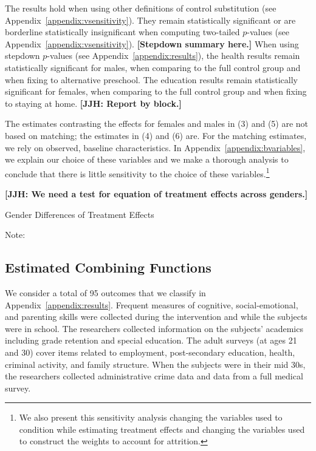 The results hold when using other definitions of control substitution (see Appendix~\ref{appendix:vsensitivity}). They remain statistically significant or are borderline statistically insignificant when computing two-tailed $p$-values (see Appendix~\ref{appendix:vsensitivity}). \textbf{[Stepdown summary here.]} When using stepdown $p$-values (see Appendix~\ref{appendix:results}), the health results remain statistically significant for males, when comparing to the full control group and when fixing to alternative preschool. The education results remain statistically significant for females, when comparing to the full control group and when fixing to staying at home. \textbf{[JJH: Report by block.]}

The estimates contrasting the effects for females and males in (3) and (5) are not based on matching; the estimates in (4) and (6) are. For the matching estimates, we rely on observed, baseline characteristics. In Appendix~\ref{appendix:bvariables}, we explain our choice of these variables and we make a thorough analysis to conclude that there is little sensitivity to the choice of these variables.\footnote{We also present this sensitivity analysis changing the variables used to condition while estimating treatment effects and changing the variables used to construct the weights to account for attrition.}

\textbf{[JJH: We need a test for equation of treatment effects across genders.]}

\begin{table}
\centering
\begin{threeparttable}
\caption{Gender Differences of Treatment Effects}\label{table:genderdifference-tes}
\begin{scriptsize}

\end{scriptsize}
\begin{tablenotes}
\scriptsize
Note: 
\end{tablenotes}
\end{threeparttable}
\end{table}

\subsection{Estimated Combining Functions}

We consider a total of 95 outcomes that we classify in Appendix~\ref{appendix:results}. Frequent measures of cognitive, social-emotional, and parenting skills were collected during the intervention and while the subjects were in school. The researchers collected information on the subjects' academics including grade retention and special education. The adult surveys (at ages 21 and 30) cover items related to employment, post-secondary education, health, criminal activity, and family structure. When the subjects were in their mid 30s, the researchers collected administrative crime data and data from a full medical survey.

